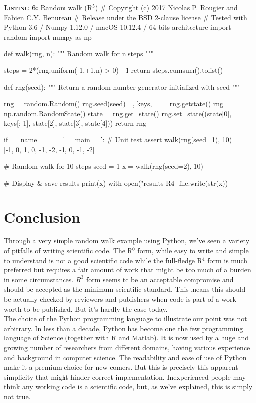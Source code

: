 \documentclass[a4paper,11pt]{article}
\begin{document}
\begin{code}{\textbf{\textsc{Listing 6:}} Random walk (R$^5$)}
# Copyright (c) 2017 Nicolas P. Rougier and Fabien C.Y. Benureau
# Release under the BSD 2-clause license
# Tested with Python 3.6 / Numpy 1.12.0 / macOS 10.12.4 / 64 bits architecture
import random
import numpy as np

def walk(rng, n):
    """ Random walk for n steps """

    steps = 2*(rng.uniform(-1,+1,n) > 0) - 1
    return steps.cumsum().tolist()

def rng(seed):
    """ Return a random number generator initialized with seed """ 
    
    rng = random.Random()
    rng.seed(seed)
    _, keys, _ = rng.getstate()
    rng = np.random.RandomState()
    state = rng.get_state()
    rng.set_state((state[0], keys[:-1], state[2], state[3], state[4]))
    return rng

if __name__ == '__main__':
    # Unit test
    assert walk(rng(seed=1), 10) == [-1, 0, 1, 0, -1, -2, -1, 0, -1, -2]

    # Random walk for 10 steps
    seed = 1
    x = walk(rng(seed=2), 10)

    # Display & save results
    print(x)
    with open("results-R4-%
        file.write(str(x))
\end{code}

\section*{Conclusion}

Through a very simple random walk example using Python, we've seen a variety of pitfalls of writing scientific code. The R$^0$ form, while easy to write and simple to understand is not a good scientific code while the full-fledge R$^{4}$ form is much preferred but requires a fair amount of work that might be too much of a burden in some circumstances. $R^3$ form seems to be an acceptable compromise and should be accepted as the minimum scientific standard. This means this should be actually checked by reviewers and publishers when code is part of a work worth to be published. But it's hardly the case today.\\

The choice of the Python programming language to illustrate our point was not arbitrary. In less than a decade, Python has become one the few programming language of Science (together with R and Matlab). It is now used by a huge and growing number of researchers from different domains, having various experience and background in computer science. The readability and ease of use of Python make it a premium choice for new comers. But this is precisely this apparent simplicity that might hinder correct implementation. Inexperienced people may think any working code is a scientific code, but, as we've explained, this is simply not true.
\end{document}
